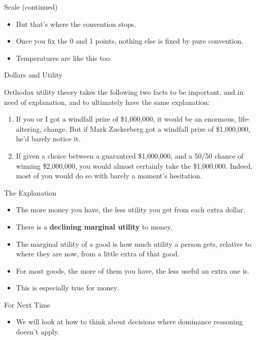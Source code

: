 \documentclass[
  ignorenonframetext,
]{beamer}
\providecommand{\tightlist}{%
  \setlength{\itemsep}{0pt}\setlength{\parskip}{0pt}}
\renewcommand{\,}{\text{, }}
\begin{document}
\begin{frame}{Scale (continued)}
\protect\hypertarget{scale-continued}{}

\begin{itemize}
\tightlist
\item
  But that's where the convention stops.
\item
  Once you fix the 0 and 1 points, nothing else is fixed by pure
  convention.
\item
  Temperatures are like this too.
\end{itemize}

\end{frame}

\begin{frame}{Dollars and Utility}
\protect\hypertarget{dollars-and-utility}{}

Orthodox utility theory takes the following two facts to be important,
and in need of explanation, and to ultimately have the same explanation:

\begin{enumerate}
\tightlist
\item
  If you or I got a windfall prize of \$1,000,000, it would be an
  enormous, life-altering, change. But if Mark Zuckerberg got a windfall
  prize of \$1,000,000, he'd barely notice it.
\item
  If given a choice between a guaranteed \$1,000,000, and a 50/50 chance
  of winning \$2,000,000, you would almost certainly take the
  \$1,000,000. Indeed, most of you would do so with barely a moment's
  hesitation.
\end{enumerate}

\end{frame}

\begin{frame}{The Explanation}
\protect\hypertarget{the-explanation}{}

\begin{itemize}
\tightlist
\item
  The more money you have, the less utility you get from each extra
  dollar.
\item
  There is a \textbf{declining marginal utility} to money.
\item
  The marginal utility of a good is how much utility a person gets,
  relative to where they are now, from a little extra of that good.
\item
  For most goods, the more of them you have, the less useful an extra
  one is.
\item
  This is especially true for money.
\end{itemize}

\end{frame}

\begin{frame}{For Next Time}
\protect\hypertarget{for-next-time}{}

\begin{itemize}
\tightlist
\item
  We will look at how to think about decisions where dominance reasoning
  doesn't apply.
\end{itemize}

\end{frame}
\end{document}
